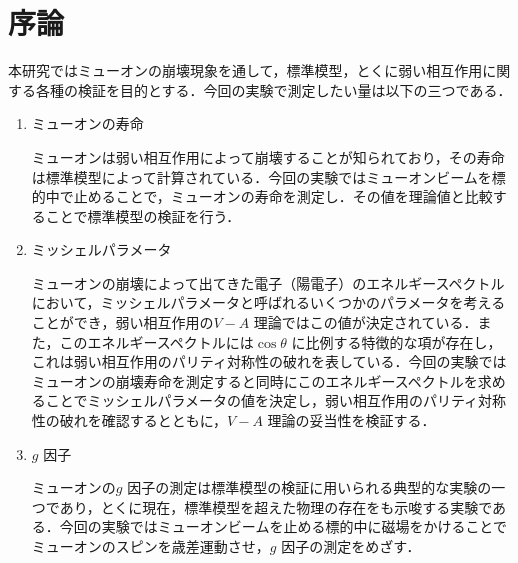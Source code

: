 





%

\section{序論}
	本研究ではミューオンの崩壊現象を通して，標準模型，とくに弱い相互作用に関する各種の検証を目的とする．今回の実験で測定したい量は以下の三つである．

	\begin{enumerate}
	\item ミューオンの寿命

	ミューオンは弱い相互作用によって崩壊することが知られており，その寿命は標準模型によって計算されている．今回の実験ではミューオンビームを標的中で止めることで，ミューオンの寿命を測定し．その値を理論値と比較することで標準模型の検証を行う．

	\item ミッシェルパラメータ

	ミューオンの崩壊によって出てきた電子（陽電子）のエネルギースペクトルにおいて，ミッシェルパラメータと呼ばれるいくつかのパラメータを考えることができ，弱い相互作用の$V - A$ 理論ではこの値が決定されている．また，このエネルギースペクトルには$\cos \theta$ に比例する特徴的な項が存在し，これは弱い相互作用のパリティ対称性の破れを表している．今回の実験ではミューオンの崩壊寿命を測定すると同時にこのエネルギースペクトルを求めることでミッシェルパラメータの値を決定し，弱い相互作用のパリティ対称性の破れを確認するとともに，$V - A$ 理論の妥当性を検証する．

	\item $g$ 因子

	ミューオンの$g$ 因子の測定は標準模型の検証に用いられる典型的な実験の一つであり，とくに現在，標準模型を超えた物理の存在をも示唆する実験である．今回の実験ではミューオンビームを止める標的中に磁場をかけることでミューオンのスピンを歳差運動させ，$g$ 因子の測定をめざす．
	\end{enumerate}

